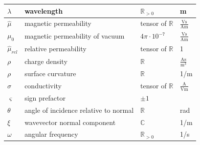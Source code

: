 \documentclass[12pt,a4paper,twoside,openright,BCOR10mm,headsepline,titlepage,abstracton,chapterprefix,final]{scrreprt}
\newcommand\vacuum{0}
\newcommand\Tensor[1]{\hat{#1}}
\newcommand\permeability{\Tensor{\scalarpermeability}}
\newcommand\vacuumpermeability{\scalarpermeability_{\vacuum}}
\newcommand\scalarpermeability{\mu}
\newcommand\relativepermeability{\Tensor{\mu}_{rel}}
\newcommand\conductivity{\Tensor{\sigma}}
\newcommand\chargedensity{\rho}
\newcommand\meter{\textrm{m}}
\newcommand\second{\textrm{s}}
\newcommand\ampere{\textrm{A}}
\newcommand\volt{\textrm{V}}
\begin{document}
\begin{tabular}{l|l|l|l}
 \hline
 $\lambda$ & wavelength & $\mathbb{R}_{>0}$ & \meter \\
 \hline
 $\permeability$ & magnetic permeability & tensor of $\mathbb{R}$ & $\frac{\volt \second}{\ampere \meter}$ \\
 $\vacuumpermeability$ & magnetic permeability of vacuum & $4\pi \cdot 10^{-7}$ & $\frac{\volt \second}{\ampere \meter}$ \\
 $\relativepermeability$ & relative permeability & tensor of $\mathbb{R}$ & 1\\
 \hline
 $\chargedensity$ & charge density & $\mathbb{R}$ & $\frac{\ampere \second}{\meter^3}$ \\
 $\rho$ & surface curvature & $\mathbb{R}$ & 1/\meter \\
 \hline
 $\conductivity$ & conductivity & tensor of $\mathbb{R}$ & $\frac{\ampere}{\volt\meter}$\\
 \hline
 $\varsigma$ & sign prefactor & $\pm 1$ & \\
 \hline
 $\theta$ & angle of incidence relative to normal & $\mathbb{R}$ & rad \\
 \hline
 $\xi$ & wavevector normal component & $\mathbb{C}$ & 1/\meter \\
 \hline
 $\omega$ & angular frequency & $\mathbb{R}_{>0}$ & 1/\second
\end{tabular}


    
\end{document}
